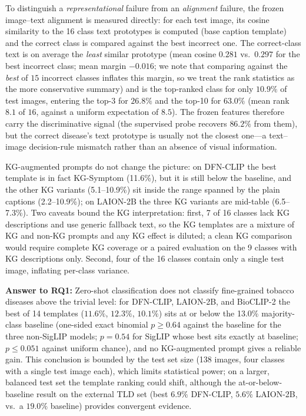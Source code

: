 \documentclass[10pt,a4paper]{article}
\begin{document}
To distinguish a \emph{representational} failure from an \emph{alignment} failure, the frozen image--text alignment is measured directly: for each test image, its cosine similarity to the 16 class text prototypes is computed (base caption template) and the correct class is compared against the best incorrect one. The correct-class text is on average the \emph{least} similar prototype (mean cosine $0.281$ vs.\ $0.297$ for the best incorrect class; mean margin $-0.016$; we note that comparing against the \emph{best} of $15$ incorrect classes inflates this margin, so we treat the rank statistics as the more conservative summary) and is the top-ranked class for only $10.9\%$ of test images, entering the top-3 for $26.8\%$ and the top-10 for $63.0\%$ (mean rank $8.1$ of $16$, against a uniform expectation of $8.5$). The frozen features therefore carry the discriminative signal (the supervised probe recovers $86.2\%$ from them), but the correct disease's text prototype is usually not the closest one---a text--image decision-rule mismatch rather than an absence of visual information.

KG-augmented prompts do not change the picture: on DFN-CLIP the best template is in fact KG-Symptom (11.6\%), but it is still below the baseline, and the other KG variants (5.1--10.9\%) sit inside the range spanned by the plain captions (2.2--10.9\%); on LAION-2B the three KG variants are mid-table (6.5--7.3\%).
Two caveats bound the KG interpretation: first, 7 of 16 classes lack KG descriptions and use generic fallback text, so the KG templates are a mixture of KG and non-KG prompts and any KG effect is diluted; a clean KG comparison would require complete KG coverage or a paired evaluation on the 9 classes with KG descriptions only.
Second, four of the 16 classes contain only a single test image, inflating per-class variance.

\textbf{Answer to RQ1:} Zero-shot classification does not classify fine-grained tobacco diseases above the trivial level: for DFN-CLIP, LAION-2B, and BioCLIP-2 the best of 14 templates ($11.6\%$, $12.3\%$, $10.1\%$) sits at or below the 13.0\% majority-class baseline (one-sided exact binomial $p\geq0.64$ against the baseline for the three non-SigLIP models; $p{=}0.54$ for SigLIP whose best sits exactly at baseline; $p\leq0.051$ against uniform chance), and no KG-augmented prompt gives a reliable gain. This conclusion is bounded by the test set size (138 images, four classes with a single test image each), which limits statistical power; on a larger, balanced test set the template ranking could shift, although the at-or-below-baseline result on the external TLD set (best $6.9\%$ DFN-CLIP, $5.6\%$ LAION-2B, vs.\ a $19.0\%$ baseline) provides convergent evidence.
\end{document}
